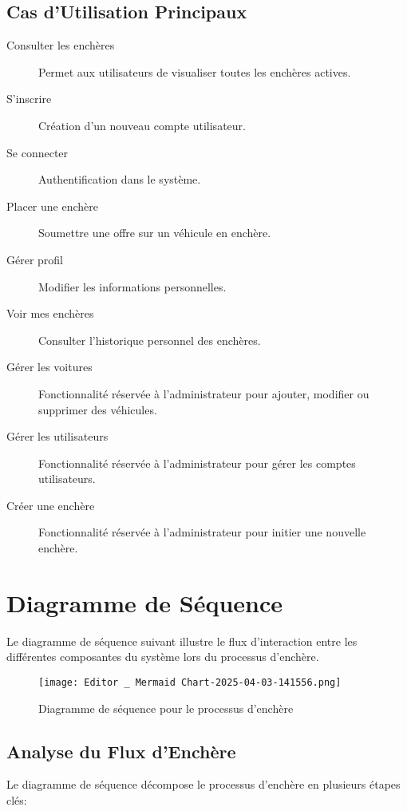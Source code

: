 \subsection{Cas d'Utilisation Principaux}
\begin{description}
    \item[Consulter les enchères] Permet aux utilisateurs de visualiser toutes les enchères actives.
    \item[S'inscrire] Création d'un nouveau compte utilisateur.
    \item[Se connecter] Authentification dans le système.
    \item[Placer une enchère] Soumettre une offre sur un véhicule en enchère.
    \item[Gérer profil] Modifier les informations personnelles.
    \item[Voir mes enchères] Consulter l'historique personnel des enchères.
    \item[Gérer les voitures] Fonctionnalité réservée à l'administrateur pour ajouter, modifier ou supprimer des véhicules.
    \item[Gérer les utilisateurs] Fonctionnalité réservée à l'administrateur pour gérer les comptes utilisateurs.
    \item[Créer une enchère] Fonctionnalité réservée à l'administrateur pour initier une nouvelle enchère.
\end{description}

\section{Diagramme de Séquence}
Le diagramme de séquence suivant illustre le flux d'interaction entre les différentes composantes du système lors du processus d'enchère.

\begin{figure}[ht]
    \centering
    \texttt{[image: Editor \_ Mermaid Chart-2025-04-03-141556.png]}
    \caption{Diagramme de séquence pour le processus d'enchère}
    \label{fig:sequence-diagram}
\end{figure}

\subsection{Analyse du Flux d'Enchère}
Le diagramme de séquence décompose le processus d'enchère en plusieurs étapes clés:

